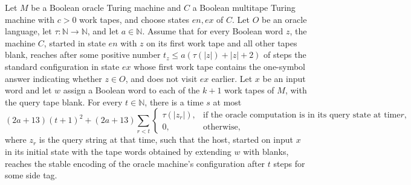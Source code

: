 \begin{theorem}
\label{Turing.oracleHost_run}
\leanok
{}
Let $M$ be a Boolean oracle Turing machine and $C$ a Boolean multitape Turing machine
with $c>0$ work tapes, and choose states $en,ex$ of $C$. Let $O$ be an oracle language,
let $\tau:\mathbb{N}\to\mathbb{N}$, and let $a\in\mathbb{N}$. Assume that for every
Boolean word $z$, the machine $C$, started in state $en$ with $z$ on its first work tape
and all other tapes blank, reaches after some positive number $t_z\le
a(\tau(|z|)+|z|+2)$ of steps the standard configuration in state $ex$ whose first work
tape contains the one-symbol answer indicating whether $z\in O$, and does not visit $ex$
earlier. Let $x$ be an input word and let $w$ assign a Boolean word to each of the $k+1$
work tapes of $M$, with the query tape blank. For every $t\in\mathbb{N}$, there is a
time $s$ at most $$(2a+13)(t+1)^2+(2a+13)\sum_{r<t}\begin{cases}\tau(|z_r|),&\text{if
the oracle computation is in its query state at time
}r,\\0,&\text{otherwise},\end{cases}$$ where $z_r$ is the query string at that time,
such that the host, started on input $x$ in its initial state with the tape words
obtained by extending $w$ with blanks, reaches the stable encoding of the oracle
machine's configuration after $t$ steps for some side tag.
\end{theorem}

